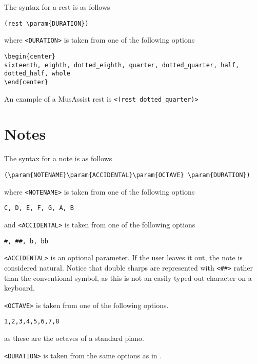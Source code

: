 \documentclass{report}
\newcommand\param[1]{\verb!<#1>!}
\begin{document}
The syntax for a rest is as follows
\begin{center}
\begin{verbatim}
(rest \param{DURATION})
\end{verbatim}
\end{center}

\noindent where \param{DURATION} is taken from one of the following options

\begin{verbatim}
\begin{center}
sixteenth, eighth, dotted_eighth, quarter, dotted_quarter, half, dotted_half, whole
\end{center}
\end{verbatim}

An example of a MusAssist rest is \param{(rest dotted_quarter)}
\section{Notes}
\label{sec:notes}
The syntax for a note is as follows

\begin{verbatim}
(\param{NOTENAME}\param{ACCIDENTAL}\param{OCTAVE} \param{DURATION})
\end{verbatim}

\noindent where \param{NOTENAME} is taken from one of the following options
\begin{verbatim}
C, D, E, F, G, A, B
\end{verbatim}

\noindent and \param{ACCIDENTAL} is taken from one of the following options
\begin{verbatim}
#, ##, b, bb
\end{verbatim}

\param{ACCIDENTAL} is an optional parameter. If the user leaves it out, the note is considered natural. Notice that double sharps are represented with \param{##} rather than the conventional \musDoubleSharp \; symbol, as this is not an easily typed out character on a keyboard.

\param{OCTAVE} is taken from one of the following options.
\begin{verbatim}
1,2,3,4,5,6,7,8
\end{verbatim}
\noindent as these are the octaves of a standard piano.

\param{DURATION} is taken from the same options as in .
\end{document}
